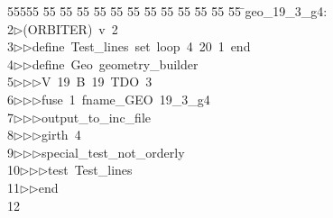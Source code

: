 %
%
\begin{tabbing}
55555 \= 55 \= 55 \= 55 \= 55 \= 55 \= 55 \= 55 \= 55 \= 55 \= 55 \= 55 \= 55 \= \>geo\_19\_3\_g4:\\[0pt]
2\>$\triangleright$\>(ORBITER)\ v\ 2\ \\[0pt]
3\>$\triangleright$\>$\triangleright$\>define\ Test\_lines\ set\ loop\ 4\ 20\ 1\ end\ \\[0pt]
4\>$\triangleright$\>$\triangleright$\>define\ Geo\ geometry\_builder\ \\[0pt]
5\>$\triangleright$\>$\triangleright$\>$\triangleright$\>V\ 19\ B\ 19\ TDO\ 3\ \\[0pt]
6\>$\triangleright$\>$\triangleright$\>$\triangleright$\>fuse\ 1\ fname\_GEO\ 19\_3\_g4\ \\[0pt]
7\>$\triangleright$\>$\triangleright$\>$\triangleright$\>output\_to\_inc\_file\ \\[0pt]
8\>$\triangleright$\>$\triangleright$\>$\triangleright$\>girth\ 4\ \\[0pt]
9\>$\triangleright$\>$\triangleright$\>$\triangleright$\>special\_test\_not\_orderly\ \\[0pt]
10\>$\triangleright$\>$\triangleright$\>$\triangleright$\>test\ Test\_lines\ \\[0pt]
11\>$\triangleright$\>$\triangleright$\>end\\[0pt]
12\>\end{tabbing}
